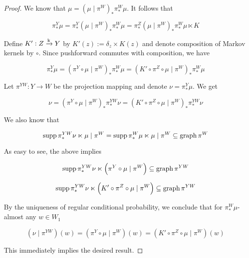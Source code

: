 \begin{proof}

We know that $\mu = \left(\mu \mid \pi^W\right)_* \pi^W_* \mu$. It follows that

\[\pi^Y_*\mu = \pi^Y_* \left(\mu \mid \pi^W\right)_* \pi^W_* \mu = \pi^Z_*\left(\mu \mid \pi^W\right)_* \pi^W_* \mu \ltimes K\]

Define $K': Z \xrightarrow{\textnormal{k}} Y$ by $K'(z):=\delta_z \times K(z)$ and denote composition of Markov kernels by $\circ$. Since pushforward commutes with composition, we have

\[\pi^Y_*\mu = \left(\pi^Y \circ\mu \mid \pi^W\right)_* \pi^W_* \mu = \left(K'  \circ \pi^Z \circ \mu \mid \pi^W\right)_* \pi^W_* \mu\]

Let $\pi^{YW}: Y \rightarrow W$ be the projection mapping and denote $\nu = \pi^Y_* \mu$. We get

\[\nu = \left(\pi^Y \circ\mu \mid \pi^W\right)_* \pi^{YW}_* \nu = \left(K'  \circ \pi^Z \circ \mu \mid \pi^W\right)_* \pi^{YW}_* \nu\]

We also know that

\[\operatorname{supp}{\pi^{YW}_* \nu \ltimes \mu \mid \pi^W} = \operatorname{supp}{\pi^{W}_* \mu \ltimes \mu \mid \pi^W \subseteq \operatorname{graph}{\pi^W}}\]
 
As easy to see, the above implies

\[\operatorname{supp}{\pi^{YW}_* \nu \ltimes \left(\pi^Y \circ\mu \mid \pi^W\right)} \subseteq \operatorname{graph}{\pi^{YW}}\]

\[\operatorname{supp}{\pi^{YW}_* \nu \ltimes \left(K'  \circ \pi^Z \circ \mu \mid \pi^W\right)} \subseteq \operatorname{graph}{\pi^{YW}}\]

By the uniqueness of regular conditional probability, we conclude that for $\pi^W_* \mu$-almost any $w \in W_1$

\[\left(\nu \mid \pi^{YW}\right)(w)= \left(\pi^Y \circ\mu \mid \pi^W\right)(w) = \left(K'  \circ \pi^Z \circ \mu \mid \pi^W\right)(w)\]

This immediately implies the desired result.
\end{proof}


